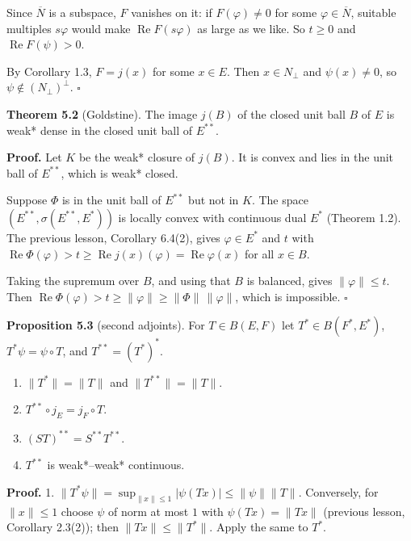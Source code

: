 \documentclass[
  english,
  11pt,
  a4paper,
]{article}
\providecommand{\tightlist}{%
  \setlength{\itemsep}{0pt}\setlength{\parskip}{0pt}}
\begin{document}
Since \(\overline N\) is a subspace, \(F\) vanishes on it: if
\(F(\varphi)\neq0\) for some \(\varphi\in\overline N\), suitable
multiples \(s\varphi\) would make \(\operatorname{Re}F(s\varphi)\) as
large as we like. So \(t\ge0\) and \(\operatorname{Re}F(\psi)>0\).

By Corollary 1.3, \(F=j(x)\) for some \(x\in E\). Then \(x\in N_\perp\)
and \(\psi(x)\ne0\), so \(\psi\notin(N_\perp)^\perp\). \(\square\)

\textbf{Theorem 5.2} (Goldstine). The image \(j(B)\) of the closed unit
ball \(B\) of \(E\) is weak* dense in the closed unit ball of
\(E^{**}\).

\textbf{Proof.} Let \(K\) be the weak* closure of \(j(B)\). It is convex
and lies in the unit ball of \(E^{**}\), which is weak* closed.

Suppose \(\Phi\) is in the unit ball of \(E^{**}\) but not in \(K\). The
space \((E^{**},\sigma(E^{**},E^*))\) is locally convex with continuous
dual \(E^*\) (Theorem 1.2). The previous lesson, Corollary 6.4(2), gives
\(\varphi\in E^*\) and \(t\) with
\(\operatorname{Re}\Phi(\varphi)>t\ge\operatorname{Re}j(x)(\varphi)=\operatorname{Re}\varphi(x)\)
for all \(x\in B\).

Taking the supremum over \(B\), and using that \(B\) is balanced, gives
\(\|\varphi\|\le t\). Then
\(\operatorname{Re}\Phi(\varphi)>t\ge\|\varphi\|\ge\|\Phi\|\,\|\varphi\|\),
which is impossible. \(\square\)

\textbf{Proposition 5.3} (second adjoints). For \(T\in B(E,F)\) let
\(T^*\in B(F^*,E^*)\), \(T^*\psi=\psi\circ T\), and \(T^{**}=(T^*)^*\).

\begin{enumerate}
\tightlist
\item
  \(\|T^*\|=\|T\|\) and \(\|T^{**}\|=\|T\|\).
\item
  \(T^{**}\circ j_E=j_F\circ T\).
\item
  \((ST)^{**}=S^{**}T^{**}\).
\item
  \(T^{**}\) is weak*--weak* continuous.
\end{enumerate}

\textbf{Proof.} 1.
\(\|T^*\psi\|=\sup_{\|x\|\le1}|\psi(Tx)|\le\|\psi\|\|T\|\). Conversely,
for \(\|x\|\le1\) choose \(\psi\) of norm at most \(1\) with
\(\psi(Tx)=\|Tx\|\) (previous lesson, Corollary 2.3(2)); then
\(\|Tx\|\le\|T^*\|\). Apply the same to \(T^*\).
\end{document}
